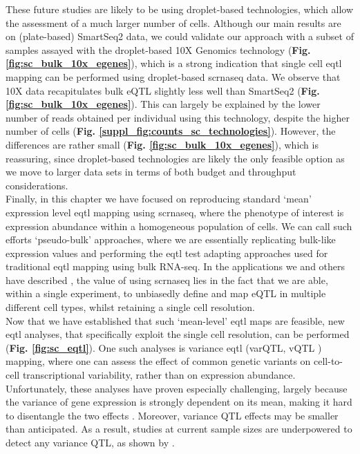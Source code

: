 These future studies are likely to be using droplet-based technologies, which allow the assessment of a much larger number of cells.
Although our main results are on (plate-based) SmartSeq2 data, we could validate our approach with a subset of samples assayed with the droplet-based 10X Genomics technology (\textbf{Fig. \ref{fig:sc_bulk_10x_egenes}}), which is a strong indication that single cell \gls{eqtl} mapping can be performed using droplet-based \gls{scrnaseq} data. 
We observe that 10X data recapitulates bulk eQTL slightly less well than SmartSeq2 (\textbf{Fig. \ref{fig:sc_bulk_10x_egenes}}).
This can largely be explained by the lower number of reads obtained per individual using this technology, despite the higher number of cells (\textbf{Fig. \ref{suppl_fig:counts_sc_technologies}}).
However, the differences are rather small (\textbf{Fig. \ref{fig:sc_bulk_10x_egenes}}), which is reassuring, since droplet-based technologies are likely the only feasible option as we move to larger data sets in terms of both budget and throughput considerations.\\

Finally, in this chapter we have focused on reproducing standard `mean' expression level \gls{eqtl} mapping using \gls{scrnaseq}, where the phenotype of interest is expression abundance within a homogeneous population of cells.
We can call such efforts `pseudo-bulk' approaches, where we are essentially replicating bulk-like expression values and performing the \gls{eqtl} test adapting approaches used for traditional \gls{eqtl} mapping using bulk RNA-seq. 
In the applications we and others have described \cite{van2018single,cuomo2020single}, the value of using \gls{scrnaseq} lies in the fact that we are able, within a single experiment, to unbiasedly define and map eQTL in multiple different cell types, whilst retaining a single cell resolution.\\

Now that we have established that such `mean-level' \gls{eqtl} maps are feasible, new \gls{eqtl} analyses, that specifically exploit the single cell resolution, can be performed (\textbf{Fig. \ref{fig:sc_eqtl}}).
One such analyses is variance \gls{eqtl} (varQTL, vQTL \cite{ayroles2015behavioral}) mapping, where one can assess the effect of common genetic variants on cell-to-cell transcriptional variability, rather than on expression abundance.
Unfortunately, these analyses have proven especially challenging, largely because the variance of gene expression is strongly dependent on its mean, making it hard to disentangle the two effects \cite{vallejos2016beyond}.
Moreover, variance QTL effects may be smaller than anticipated.
As a result, studies at current sample sizes are underpowered to detect any variance QTL, as shown by \cite{sarkar2019discovery}. \\

